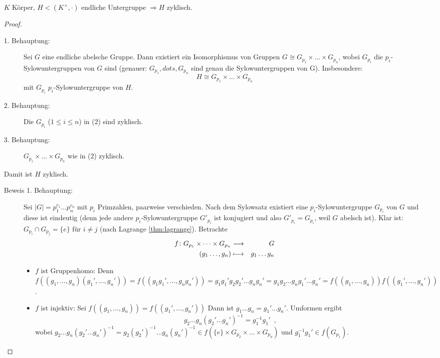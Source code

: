 \documentclass[12pt,a4paper]{scrartcl}
\begin{document}
\begin{satz}\label{thm:17.3}
	$K$ Körper, $H<(K^{\times},\cdot)$ endliche Untergruppe $\Rightarrow H$ zyklisch.
\end{satz}
\begin{proof}
	\leavevmode
	\begin{description}
		\item[1. Behauptung:] Sei $G$ eine endliche abelsche Gruppe. Dann existiert ein Isomorphismus von Gruppen $G\cong G_{p_1}\times\dots\times G_{p_n}$, wobei $G_{p_i}$ die $p_i$-Sylowuntergruppen von $G$ sind (genauer: $G_{p_1},dots,G_{p_n}$ sind genau die Sylowuntergruppen von G). Insbesondere:
		\begin{equation}
			H\cong G_{p_1}\times\dots\times G_{p_n}
		\end{equation}
		mit $G_{p_i}$ $p_i$-Sylowuntergruppe von $H$.
		\item[2. Behauptung:] Die $G_{p_i}$ ($1\leq i\leq n$) in (2) sind zyklisch.
		\item[3. Behauptung:] $G_{p_1}\times\dots\times G_{p_n}$ wie in (2) zyklisch.
	\end{description}
	Damit ist $H$ zyklisch.
	\begin{description}
		\item[Beweis 1. Behauptung:] Sei $|G| = p_1^{c_1}\dots p_n^{c_n}$ mit $p_i$ Primzahlen, paarweise verschieden. Nach dem Sylowsatz existiert eine $p_i$-Sylowuntergruppe $G_{p_i}$ von $G$ und diese ist eindeutig (denn jede andere $p_i$-Sylowuntergruppe $G'_{p_i}$ ist konjugiert und also $G'_{p_i} = G_{p_i}$, weil $G$ abelsch ist). Klar ist: $G_{p_i}\cap G_{p_j} = \{e\}$ für $i\neq j$ (nach Lagrange \ref{thm:lagrange}). Betrachte
		\begin{eqnarray*}
			f\colon G_{p_1}\times\dots\times G_{p_n} & \longrightarrow & G\\
			(g_1\dots, g_n) & \longmapsto & g_1\dots g_n
		\end{eqnarray*}
		\begin{itemize}
			\item $f$ ist Gruppenhomo: Denn $f((g_1,\dots, g_n)(g_1',\dots, g_n')) = f((g_1g_1',\dots, g_ng_n')) = g_1g_1'g_2g_2'\dots g_ng_n' = g_1g_2\dots g_ng_1'\dots g_n' = f((g_1,\dots, g_n))f((g_1',\dots, g_n'))$.
			\item $f$ ist injektiv: Sei $f((g_1,\dots, g_n)) = f((g_1',\dots, g_n'))$ Dann ist $g_1\dots g_n = g_1'\dots g_n'$. Umformen ergibt
			$$ g_2\dots g_n(g_2'\dots g_n')^{-1} = g_1^{-1}g_1'\enspace,$$
			wobei $g_2\dots g_n(g_2'\dots g_n')^{-1}  = g_2(g_2')^{-1}\dots g_n(g_n')^{-1}\in f(\{e\}\times G_{p_2}\times \dots \times G_{p_n})$ und $g_1^{-1}g_1'\in f(G_{p_1})$.
			

\end{itemize}
\end{description}
\end{proof}
\end{document}
